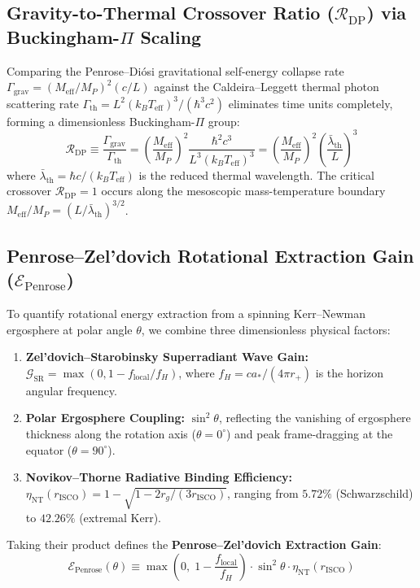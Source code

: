 \documentclass[11pt,a4paper]{article}
\begin{document}
\subsection{Gravity-to-Thermal Crossover Ratio ($\mathcal{R}_{\mathrm{DP}}$) via Buckingham-$\Pi$ Scaling}
Comparing the Penrose--Diósi gravitational self-energy collapse rate $\Gamma_{\mathrm{grav}} = (M_{\mathrm{eff}} / M_P)^2 (c / L)$ against the Caldeira--Leggett thermal photon scattering rate $\Gamma_{\mathrm{th}} = L^2 (k_B T_{\mathrm{eff}})^3 / (\hbar^3 c^2)$ eliminates time units completely, forming a dimensionless Buckingham-$\Pi$ group:
\begin{equation}
\mathcal{R}_{\mathrm{DP}} \equiv \frac{\Gamma_{\mathrm{grav}}}{\Gamma_{\mathrm{th}}} = \left(\frac{M_{\mathrm{eff}}}{M_P}\right)^2 \frac{\hbar^2 c^3}{L^3 (k_B T_{\mathrm{eff}})^3} = \left(\frac{M_{\mathrm{eff}}}{M_P}\right)^2 \left(\frac{\bar{\lambda}_{\mathrm{th}}}{L}\right)^3
\end{equation}
where $\bar{\lambda}_{\mathrm{th}} = \hbar c / (k_B T_{\mathrm{eff}})$ is the reduced thermal wavelength. The critical crossover $\mathcal{R}_{\mathrm{DP}} = 1$ occurs along the mesoscopic mass-temperature boundary $M_{\mathrm{eff}} / M_P = (L / \bar{\lambda}_{\mathrm{th}})^{3/2}$.

\subsection{Penrose--Zel'dovich Rotational Extraction Gain ($\mathcal{E}_{\mathrm{Penrose}}$)}
To quantify rotational energy extraction from a spinning Kerr--Newman ergosphere at polar angle $\theta$, we combine three dimensionless physical factors:
\begin{enumerate}
    \item \textbf{Zel'dovich--Starobinsky Superradiant Wave Gain:} $\mathcal{G}_{\mathrm{SR}} = \max(0, 1 - f_{\mathrm{local}} / f_H)$, where $f_H = c a_* / (4\pi r_+)$ is the horizon angular frequency.
    \item \textbf{Polar Ergosphere Coupling:} $\sin^2\theta$, reflecting the vanishing of ergosphere thickness along the rotation axis ($\theta = 0^\circ$) and peak frame-dragging at the equator ($\theta = 90^\circ$).
    \item \textbf{Novikov--Thorne Radiative Binding Efficiency:} $\eta_{\mathrm{NT}}(r_{\mathrm{ISCO}}) = 1 - \sqrt{1 - 2r_g / (3 r_{\mathrm{ISCO}})}$, ranging from $5.72\%$ (Schwarzschild) to $42.26\%$ (extremal Kerr).
\end{enumerate}
Taking their product defines the \textbf{Penrose--Zel'dovich Extraction Gain}:
\begin{equation}
\mathcal{E}_{\mathrm{Penrose}}(\theta) \equiv \max\left(0,\; 1 - \frac{f_{\mathrm{local}}}{f_H}\right) \cdot \sin^2\theta \cdot \eta_{\mathrm{NT}}(r_{\mathrm{ISCO}})
\end{equation}
\end{document}
